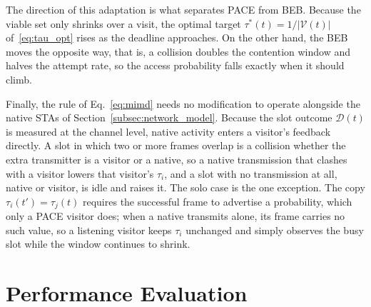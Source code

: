 \documentclass[conference]{IEEEtran}
\begin{document}
The direction of this adaptation is what separates PACE from BEB. Because the viable set only shrinks over a visit, the optimal target $\tau^*(t)=1/|\mathcal{V}(t)|$ of~\eqref{eq:tau_opt} rises as the deadline approaches. On the other hand, the BEB moves the opposite way, that is, a collision doubles the contention window and halves the attempt rate, so the access probability falls exactly when it should climb.

Finally, the rule of Eq.~\eqref{eq:mimd} needs no modification to operate alongside the native STAs of Section~\ref{subsec:network_model}. Because the slot outcome $\mathcal{D}(t)$ is measured at the channel level, native activity enters a visitor's feedback directly. A slot in which two or more frames overlap is a collision whether the extra transmitter is a visitor or a native, so a native transmission that clashes with a visitor lowers that visitor's $\tau_i$, and a slot with no transmission at all, native or visitor, is idle and raises it. The solo case is the one exception. The copy $\tau_i(t') = \tau_j(t)$ requires the successful frame to advertise a probability, which only a PACE visitor does; when a native transmits alone, its frame carries no such value, so a listening visitor keeps $\tau_i$ unchanged and simply observes the busy slot while the window continues to shrink.


\section{Performance Evaluation}
\label{sec:performance_evaluation}
\end{document}
